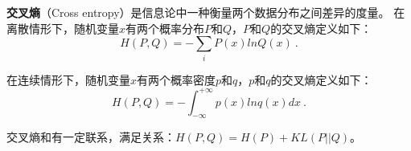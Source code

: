 


\textbf{交叉熵}（Cross entropy）是信息论中一种衡量两个数据分布之间差异的度量。
在离散情形下，随机变量$x$有两个概率分布$P$和$Q$，$P$和$Q$的交叉熵定义如下：
\begin{equation}
H(P,Q)=-\sum_iP(x)lnQ(x)~.
\end{equation}

在连续情形下，随机变量$x$有两个概率密度$p$和$q$，$p$和$q$的交叉熵定义如下：
\begin{equation}
H(P,Q)=- \int_{-\infty}^{+\infty}p(x)lnq(x)dx~.
\end{equation}

交叉熵和有一定联系，满足关系：$H(P,Q)=H(P)+KL(P||Q)$。

